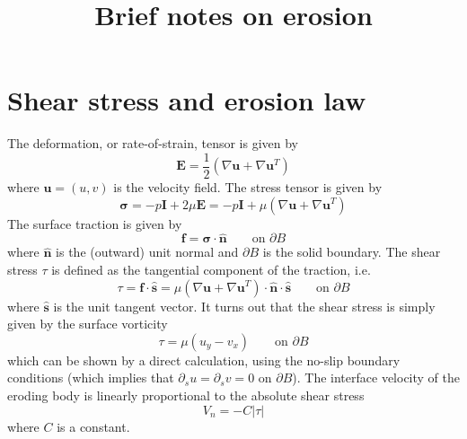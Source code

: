 \documentclass[11pt]{article}
\newcommand{\pdi}[2] { {\partial_#2} #1 }
\newcommand{\grad}{\nabla}
\newcommand{\bvec}[1]{\ensuremath{\boldsymbol{#1}}}
\newcommand{\abs}[1]{\left| #1 \right|}
\newcommand {\bu} {\bvec{u}}
\newcommand{\nhat}{\hat{\bvec{n}}}
\newcommand{\shat}{\hat{\bvec{s}}}
\newcommand{\atau}{\abs{\tau}}
\newcommand {\bdry} {\partial B}
\newcommand {\onBdry} {\text{on } \bdry }
\begin{document}
\title{Brief notes on erosion}
\author{}
\maketitle


\section{Shear stress and erosion law}
The deformation, or rate-of-strain, tensor is given by
\begin{equation}
\bvec{E} = \frac{1}{2} \left( \grad \bu + \grad \bu^T \right)
\end{equation}
where $\bu = (u,v)$ is the velocity field. The stress tensor is given by
\begin{equation}
\bvec{\sigma} = -p \bvec{I} + 2 \mu \bvec{E} = -p \bvec{I} + \mu \left( \grad \bu + \grad \bu^T \right)
\end{equation}
The surface traction is given by
\begin{equation}
\bvec{f} = \bvec{\sigma} \cdot \nhat 	\qquad \onBdry
\end{equation}
where $\nhat$ is the (outward) unit normal and $\bdry$ is the solid boundary. The shear stress $\tau$ is defined as the tangential component of the traction, i.e.~
\begin{equation}
\label{stressdef}
\tau = \bvec{f} \cdot \shat 
= \mu \left( \grad \bu + \grad \bu^T \right) \cdot \nhat \cdot \shat	\qquad \onBdry
\end{equation}
where $\shat$ is the unit tangent vector. It turns out that the shear stress is simply given by the surface vorticity
\begin{equation}
\tau = \mu \left( u_y - v_x \right) \qquad \onBdry
\end{equation}
which can be shown by a direct calculation, using the no-slip boundary conditions (which implies that $\pdi{u}{s} = \pdi{v}{s} = 0$ on $\bdry$).
The interface velocity of the eroding body is linearly proportional to the absolute shear stress
\begin{equation}
V_n = -C \atau
\end{equation}
where $C$ is a constant.
\end{document}
